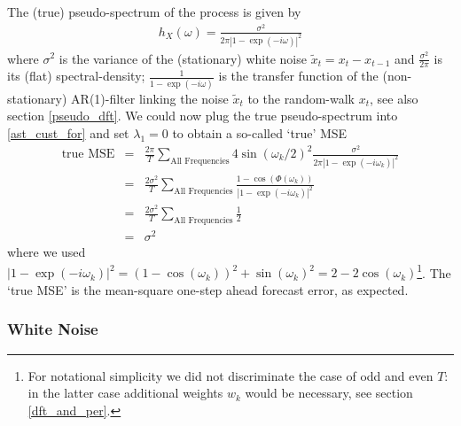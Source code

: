 \documentclass[a4paper]{book}
\begin{document}
The (true) pseudo-spectrum of the process is given by 
\begin{eqnarray}\label{pseudo_spectrum}
h_X(\omega)=\frac{\sigma^2}{2\pi|1-\exp(-i\omega)|^2}
\end{eqnarray} 
where $\sigma^2$ is the variance of the (stationary) white noise $\tilde{x}_t=x_t-x_{t-1}$ and $\displaystyle{\frac{\sigma^2}{2\pi}}$ is its (flat) spectral-density;  $\displaystyle{\frac{1}{1-\exp(-i\omega)}}$ is the transfer function of the (non-stationary) AR(1)-filter linking the noise $\tilde{x}_t$ to the random-walk $x_t$, see also section \ref{pseudo_dft}. We could now plug the true pseudo-spectrum into \ref{ast_cust_for} and set $\lambda_1=0$ to obtain a so-called `true' MSE%
\begin{eqnarray}
\textrm{true~MSE}&=&\frac{2\pi}{ T}  \sum_{\textrm{All~Frequencies}} 4\sin\left(\omega_k/2\right)^2\frac{\sigma^2}{2\pi|1-\exp(-i\omega_k)|^2}\nonumber\\
&=&\frac{2\sigma^2}{ T}  \sum_{\textrm{All~Frequencies}} \frac{1-\cos(\Phi(\omega_k))}{|1-\exp(-i\omega_k)|^2}\nonumber\\
&=&\frac{2\sigma^2}{ T}  \sum_{\textrm{All~Frequencies}} \frac{1}{2}\label{rwmse}\\
&=&\sigma^2\nonumber
\end{eqnarray}
where we used $|1-\exp(-i\omega_k)|^2=(1-\cos(\omega_k))^2+\sin(\omega_k)^2=2-2\cos(\omega_k)$\footnote{For notational simplicity we did not discriminate the case of odd and even $T$: in the latter case additional weights $w_k$ would be necessary, see section \ref{dft_and_per}.}. The `true MSE' is the mean-square one-step ahead forecast error, as expected.



\subsubsection{White Noise}
\end{document}
